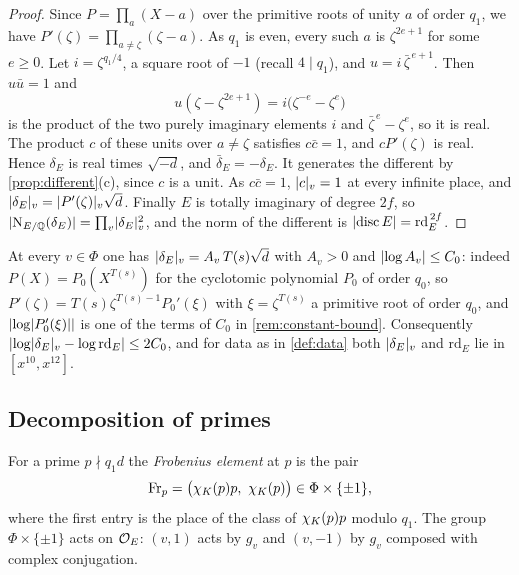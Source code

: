 \begin{proof}
Since $P=\prod_a(X-a)$ over the primitive roots of unity $a$ of order $q_1$, we have
$P'(\zeta)=\prod_{a\ne\zeta}(\zeta-a)$. As $q_1$ is even, every such $a$ is $\zeta^{2e+1}$ for some
$e\ge0$. Let $i=\zeta^{q_1/4}$, a square root of $-1$ (recall $4\mid q_1$), and
$u=i\,\bar\zeta^{\,e+1}$. Then $u\bar u=1$ and
\[
  u(\zeta-\zeta^{2e+1})=i\bigl(\zeta^{-e}-\zeta^{e}\bigr)
\]
is the product of the two purely imaginary elements $i$ and $\bar\zeta^{\,e}-\zeta^e$, so it is
real. The product $c$ of these units over $a\neq\zeta$ satisfies $c\bar c=1$, and $cP'(\zeta)$ is
real. Hence $\delta_E$ is real times $\sqrt{-d}$, and $\bar\delta_E=-\delta_E$. It generates the
different by \cref{prop:different}(c), since $c$ is a unit. As $c\bar c=1$, $\lvert c\rvert_v=1$ at every
infinite place, and $\lvert \delta_E\rvert_v=\lvert P'(\zeta)\rvert_v\sqrt d$. Finally $E$ is totally imaginary of
degree $2f$, so $\lvert \operatorname{N}_{E/\mathbb{Q}}(\delta_E)\rvert=\prod_v\lvert \delta_E\rvert_v^2$, and the norm of the different
is $\lvert \operatorname{disc} E\rvert=\mathrm{rd}_E^{\,2f}$.
\end{proof}

\begin{remark}\label{rem:delta-size}
At every $v\in\Phi$ one has $\lvert \delta_E\rvert_v=A_v\,T(s)\sqrt d$ with $A_v>0$ and
$\lvert \log A_v\rvert\le C_0$: indeed $P(X)=P_0(X^{T(s)})$ for the cyclotomic polynomial $P_0$ of order
$q_0$, so $P'(\zeta)=T(s)\zeta^{T(s)-1}P_0'(\xi)$ with $\xi=\zeta^{T(s)}$ a primitive root of order
$q_0$, and $\lvert \log\lvert P_0'(\xi)\rvert\rvert$ is one of the terms of $C_0$ in \cref{rem:constant-bound}.
Consequently $\lvert \log\lvert \delta_E\rvert_v-\log\mathrm{rd}_E\rvert\le2C_0$, and for data as in
\cref{def:data} both $\lvert \delta_E\rvert_v$ and $\mathrm{rd}_E$ lie in $[x^{10},x^{12}]$.
\end{remark}

\subsection{Decomposition of primes}\label{ss:decomposition}
For a prime $p\nmid q_1d$ the \emph{Frobenius element} at $p$ is the pair
\[
  \mathrm{Fr}_p=\bigl(\chiK(p)p,\ \chiK(p)\bigr)\in\Phi\times\{\pm1\},
\]
where the first entry is the place of the class of $\chi_K(p)p$ modulo $q_1$. The group
$\Phi\times\{\pm1\}$ acts on $\mathcal{O}_E$: $(v,1)$ acts by $g_v$ and $(v,-1)$ by $g_v$ composed with
complex conjugation.

